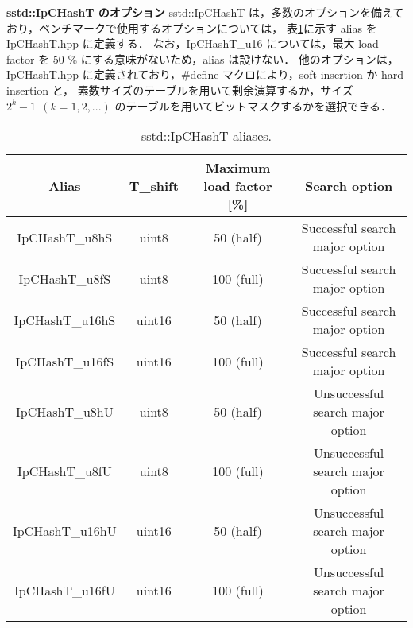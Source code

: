 {\bf sstd::IpCHashT のオプション}
\samepage\newline\indent
sstd::IpCHashT は，多数のオプションを備えており，ベンチマークで使用するオプションについては，
表\ref{table_alias}に示す alias を IpCHashT.hpp に定義する．
なお，IpCHashT\_u16 については，最大 load factor を 50 \% にする意味がないため，alias は設けない．
他のオプションは，IpCHashT.hpp に定義されており，\#define マクロにより，soft insertion か hard insertion と，
素数サイズのテーブルを用いて剰余演算するか，サイズ $2^k-1\ \ (k=1,2,...)$ のテーブルを用いてビットマスクするかを選択できる．

\begin{table}[h]
  \begin{center}
    \fontsize{9pt}{10pt}\selectfont
    \caption{sstd::IpCHashT aliases.}
    \begin{tabular}{c|ccc} \hline
      Alias           & T\_shift & Maximum load factor [\%] \rule[0pt]{0pt}{10pt} & Search option \\ \hline
      IpCHashT\_u8hS  & uint8    &  50 (half)                                     &   Successful search major option \rule[0pt]{0pt}{10pt} \\
      IpCHashT\_u8fS  & uint8    & 100 (full)                                     &   Successful search major option \rule[0pt]{0pt}{10pt} \\
      IpCHashT\_u16hS & uint16   &  50 (half)                                     &   Successful search major option \rule[0pt]{0pt}{10pt} \\
      IpCHashT\_u16fS & uint16   & 100 (full)                                     &   Successful search major option \rule[0pt]{0pt}{10pt} \\
      IpCHashT\_u8hU  & uint8    &  50 (half)                                     & Unsuccessful search major option \rule[0pt]{0pt}{10pt} \\
      IpCHashT\_u8fU  & uint8    & 100 (full)                                     & Unsuccessful search major option \rule[0pt]{0pt}{10pt} \\
      IpCHashT\_u16hU & uint16   &  50 (half)                                     & Unsuccessful search major option \rule[0pt]{0pt}{10pt} \\
      IpCHashT\_u16fU & uint16   & 100 (full)                                     & Unsuccessful search major option \rule[0pt]{0pt}{10pt} \\ \hline
    \end{tabular}
    \label{table_alias}
  \end{center}
\end{table}


